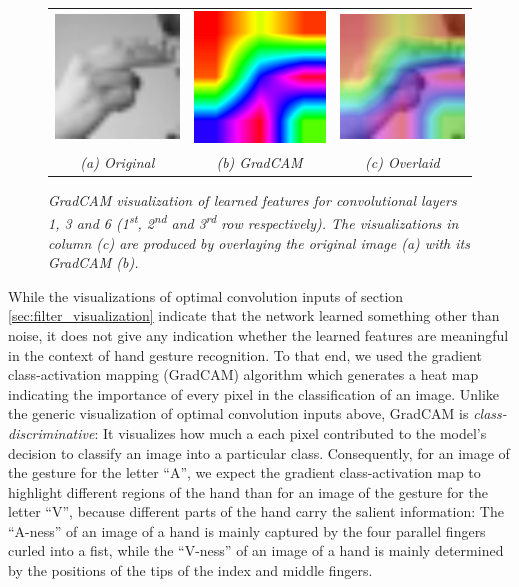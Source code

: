 \documentclass[a4paper]{article}
\newcommand{\ts}{\textsuperscript}
\begin{document}
\begin{figure}[t]
\begin{tabular}{ccc}
          \includegraphics[width=.25\linewidth]{graphics/gradcam/layer6/1_original}&\includegraphics[width=.25\linewidth]{graphics/gradcam/layer6/1_map}&\includegraphics[width=.25\linewidth]{graphics/gradcam/layer6/1_overlaid} \\
          \textit{(a) Original} & \textit{(b) GradCAM} & \textit{(c) Overlaid}
     \end{tabular}
     \caption{\textit{GradCAM visualization of learned features for convolutional layers 1, 3 and 6 (1\ts{st}, 2\ts{nd} and 3\ts{rd} row respectively). The visualizations in column (c) are produced by overlaying the original image (a) with its GradCAM (b).}}
     \label{fig:gradcam}
\end{figure}
While the visualizations of optimal convolution inputs of section \ref{sec:filter_visualization} indicate that the network learned something other than noise, it does not give any indication whether the learned features are meaningful in the context of hand gesture recognition. To that end, we used the gradient class-activation mapping (GradCAM) algorithm which generates a heat map indicating the importance of every pixel in the classification of an image. Unlike the generic visualization of optimal convolution inputs above, GradCAM is \textit{class-discriminative}: It visualizes how much a each pixel contributed to the model's decision to classify an image into a particular class. Consequently, for an image of the gesture for the letter \enquote{A}, we expect the gradient class-activation map to highlight different regions of the hand than for an image of the gesture for the letter \enquote{V}, because different parts of the hand carry the salient information: The \enquote{A-ness} of an image of a hand is mainly captured by the four parallel fingers curled into a fist, while the \enquote{V-ness} of an image of a hand is mainly determined by the positions of the tips of the index and middle fingers.\\
\end{document}
